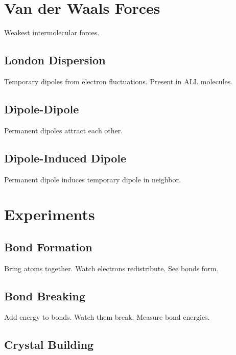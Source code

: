 \documentclass[
  11pt,
  letterpaper,
  twoside,
  openright]{book}
\begin{document}
\section{Van der Waals Forces}\label{van-der-waals-forces}

Weakest intermolecular forces.

\subsection{London Dispersion}\label{london-dispersion}

Temporary dipoles from electron fluctuations. Present in ALL molecules.

\subsection{Dipole-Dipole}\label{dipole-dipole}

Permanent dipoles attract each other.

\subsection{Dipole-Induced Dipole}\label{dipole-induced-dipole}

Permanent dipole induces temporary dipole in neighbor.

\section{Experiments}\label{experiments-4}

\subsection{Bond Formation}\label{bond-formation}

Bring atoms together. Watch electrons redistribute. See bonds form.

\subsection{Bond Breaking}\label{bond-breaking}

Add energy to bonds. Watch them break. Measure bond energies.

\subsection{Crystal Building}\label{crystal-building}
\end{document}
